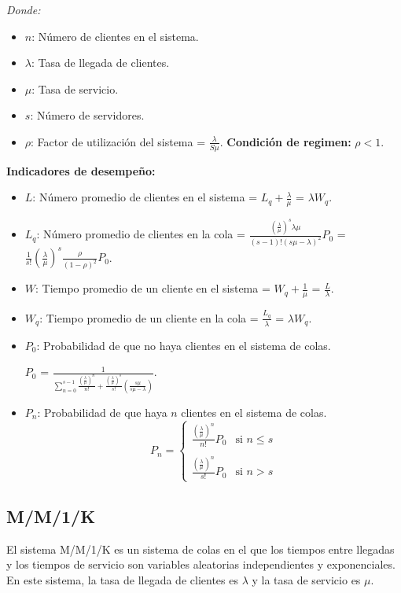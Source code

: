 \documentclass{templateNote}
\begin{document}
\textit{Donde:}
\begin{itemize}
    \item $n$: Número de clientes en el sistema.
    \item $\lambda$: Tasa de llegada de clientes.
    \item $\mu$: Tasa de servicio.
    \item $s$: Número de servidores.
    \item $\rho$: Factor de utilización del sistema = $\frac{\lambda}{S\mu}$. \textbf{Condición de regimen:} $\rho < 1$.
\end{itemize}

\textbf{Indicadores de desempeño:}
\begin{itemize}
    \item $L$: Número promedio de clientes en el sistema = $L_q + \frac{\lambda}{\mu}$ = $\lambda W_q$.
    \item $L_q$: Número promedio de clientes en la cola = $\frac{(\frac{\lambda}{\mu})^s \lambda \mu}{(s-1)! (s\mu-\lambda)^2}P_0$ = $\frac{1}{s!}(\frac{\lambda}{\mu})^s \frac{\rho}{(1-\rho)^2}P_0$.
    \item $W$: Tiempo promedio de un cliente en el sistema = $W_q+\frac{1}{\mu}$ = $\frac{L}{\lambda}$.
    \item $W_q$: Tiempo promedio de un cliente en la cola = $\frac{L_q}{\lambda}$ = $\lambda W_q$.
    \item $P_0$: Probabilidad de que no haya clientes en el sistema de colas.
    \begin{center}
        $P_0$ = $\frac{1}{\sum_{n=0}^{s-1} \frac{(\frac{\lambda}{\mu})^n}{n!} + \frac{(\frac{\lambda}{\mu})^s}{s!} (\frac{s\mu}{s\mu-\lambda})}$.
    \end{center}
    \item $P_n$: Probabilidad de que haya $n$ clientes en el sistema de colas.
    \[
    P_n = \left\{
        \begin{array}{ll}
          \frac{(\frac{\lambda}{\mu})^n}{n!}P_0 & \text{si } n \leq  s \\\\
          \frac{(\frac{\lambda}{\mu})^n}{s!}P_0 & \text{si } n > s
        \end{array}
      \right.
    \]  
    
\end{itemize}

\subsection{M/M/1/K}
\noindent El sistema M/M/1/K es un sistema de colas en el que los tiempos entre llegadas y los tiempos de servicio son variables aleatorias independientes y exponenciales. En este sistema, la tasa de llegada de clientes es $\lambda$ y la tasa de servicio es $\mu$.
\end{document}
